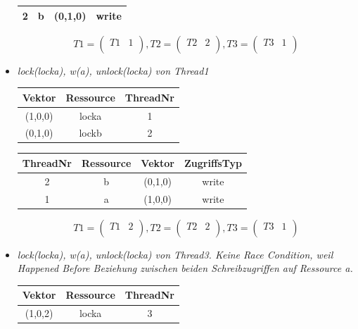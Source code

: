\documentclass[10pt,a4paper]{article}
\begin{document}
\begin{flushleft}
\begin{itemize}
\begin{tabular}{ >{\small}c >{\small}c >{\small}c >{\small}c }
  	2 & b & (0,1,0) & write \\\hline
\end{tabular}
\[
	T1 = \begin{pmatrix}
		T1 & 1\\
	\end{pmatrix}
	, T2 = \begin{pmatrix}
		T2 & 2\\
	\end{pmatrix}
	, T3 = \begin{pmatrix}
		T3 & 1\\
	\end{pmatrix}
\]
\item \textit{lock(locka), w(a), unlock(locka) von Thread1}\\[0.3cm]
\begin{tabular}{ >{\small}c >{\small}c >{\small}c }
  	Vektor & Ressource & ThreadNr \\\hline
  	(1,0,0) & locka & 1 \\
  	(0,1,0) & lockb & 2 \\\hline
\end{tabular}\hspace*{0.5cm}
\begin{tabular}{ >{\small}c >{\small}c >{\small}c >{\small}c }
  	ThreadNr & Ressource & Vektor & ZugriffsTyp \\\hline
  	2 & b & (0,1,0) & write \\
  	1 & a & (1,0,0) & write \\\hline
\end{tabular}
\[
	T1 = \begin{pmatrix}
		T1 & 2\\
	\end{pmatrix}
	, T2 = \begin{pmatrix}
		T2 & 2\\
	\end{pmatrix}
	, T3 = \begin{pmatrix}
		T3 & 1\\
	\end{pmatrix}
\]\newpage
\item \textit{lock(locka), w(a), unlock(locka) von Thread3. Keine Race Condition, weil Happened Before Beziehung zwischen beiden Schreibzugriffen auf Ressource a.}\\[0.3cm]
\begin{tabular}{ >{\small}c >{\small}c >{\small}c }
  	Vektor & Ressource & ThreadNr \\\hline
  	(1,0,2) & locka & 3 \\

\end{tabular}
\end{itemize}
\end{flushleft}
\end{document}

